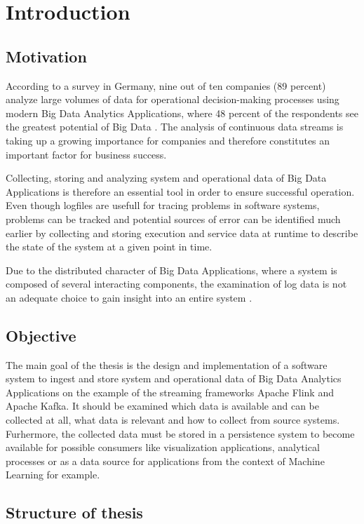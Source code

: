 \chapter{Introduction}
\section{Motivation}
According to a survey in Germany, nine out of ten companies (89 percent) analyze large
volumes of data for operational decision-making processes using modern Big Data Analytics
Applications, where 48 percent of the respondents see the greatest potential of Big Data
\cite{Bitk14}. The analysis of continuous data streams is taking up a growing importance
for companies and therefore constitutes an important factor for business success.

Collecting, storing and analyzing system and operational data of Big Data Applications is
therefore an essential tool in order to ensure successful operation. Even though logfiles are
usefull for tracing problems in software systems, problems can be tracked and potential sources
of error can be identified much earlier by collecting and storing execution and service data at
runtime to describe the state of the system at a given point in time.

Due to the distributed character of Big Data Applications, where a system is composed of several
interacting components, the examination of log data is not an adequate choice to gain insight
into an entire system \cite{VanL14}.

\section{Objective}

The main goal of the thesis is the design and implementation of a software system to ingest
and  store system and operational data of Big Data Analytics Applications on the example of
the streaming frameworks Apache Flink and Apache Kafka. It should be examined which data is
available and can be collected at all, what data is relevant and how to collect from source
systems. Furhermore, the collected data must be stored in a persistence system to become
available for possible consumers like visualization applications, analytical processes or as
a data source for applications from the context of Machine Learning for example.

\section{Structure of thesis}

